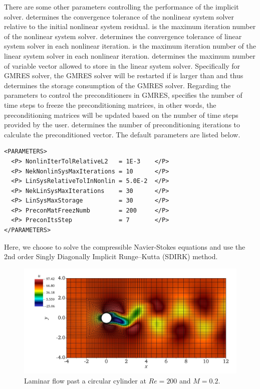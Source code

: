 There are some other parameters controlling the performance of the implicit 
solver.  determines the convergence tolerance 
of the nonlinear system solver relative to the initial nonlinear system residual. 
 is the maximum iteration number of the 
nonlinear system solver.  determines the 
convergence tolerance of linear system solver in each nonlinear iteration. 
 is the maximum iteration number of the linear 
system solver in each nonlinear iteration.  determines 
the maximum number of variable vector allowed to store in the linear system 
solver. Specifically for GMRES solver, the GMRES solver will be restarted if 
 is larger than  and thus 
 determines the storage consumption of the GMRES solver. 
Regarding the parameters to control the preconditioners in GMRES, 
 specifies the number of time steps to freeze the 
preconditioning matrices, in other words, the preconditioning matrices will be 
updated based on the number of time steps provided by the user.  
determines the number of preconditioning iterations to calculate the
preconditioned vector. The default parameters are listed below. 

\begin{lstlisting}[style=XmlStyle]
<PARAMETERS>
  <P> NonlinIterTolRelativeL2   = 1E-3    </P>
  <P> NekNonlinSysMaxIterations = 10      </P>
  <P> LinSysRelativeTolInNonlin = 5.0E-2  </P>
  <P> NekLinSysMaxIterations    = 30      </P>
  <P> LinSysMaxStorage          = 30      </P>
  <P> PreconMatFreezNumb        = 200     </P>
  <P> PreconItsStep             = 7       </P>
</PARAMETERS>
\end{lstlisting}


Here, we choose to solve the compressible Navier-Stokes equations and use the 
2nd order Singly Diagonally Implicit Runge–Kutta (SDIRK) method.
\begin{figure}[!htbp]
	\begin{center}
		\centering	
		\includegraphics[scale=0.18,trim=0 0 0 0,clip]{img/CylinderSubsonic.jpeg}
		\caption{Laminar flow past a circular cylinder at $Re=200$ and $M=0.2$.}
		\label{fig:fpcc}
	\end{center}
\end{figure}
